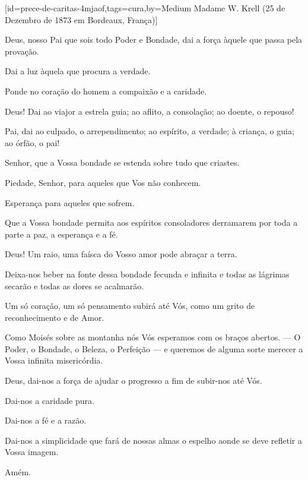 \sclearpage
{}[id={prece-de-caritas-4mjaof},tags={cura},by={Medium Madame W. Krell (25 de Dezembro de 1873 em Bordeaux, França)}]
  \begin{passage}[PT]{}
    Deus, nosso Pai que sois todo Poder e Bondade, dai
    a força àquele que passa pela provação.
    \par
    Dai a luz àquela que procura a verdade.
    \par
    Ponde no coração do homem a compaixão e a caridade.
    \par
    Deus! Dai ao viajor a estrela guia; ao aflito,
    a consolação; ao doente, o repouso!
    \par
    Pai, dai ao culpado, o arrependimento; ao espírito,
    a verdade; à criança, o guia; ao órfão, o pai!
    \par
    Senhor, que a Vossa bondade se estenda sobre tudo
    que criastes.
    \par
    Piedade, Senhor, para aqueles que Vos não conhecem.
    \par
    Esperança para aqueles que sofrem.
    \par
    Que a Vossa bondade permita aos espíritos
    consoladores derramarem por toda a parte a paz, a
    esperança e a fé.
    \par
    Deus! Um raio, uma faísca do Vosso amor pode abraçar
    a terra.
    \par
    Deixa-nos beber na fonte dessa bondade fecunda
    e infinita e todas as lágrimas secarão e todas as
    dores se acalmarão.
    \par
    Um só coração, um só pensamento subirá até Vós,
    como um grito de reconhecimento e de Amor.
    \par
    Como Moisés sobre as montanha nós Vós esperamos
    com os braços abertos. ---
    O Poder, o Bondade, o Beleza, o Perfeição ---
    e queremos de alguma sorte merecer a Vossa infinita
    misericórdia.
    \par
    Deus, dai-nos a força de ajudar o progresso a fim
    de subir-nos até Vós.
    \par
    Dai-nos a caridade pura.
    \par
    Dai-nos a fé e a razão.
    \par
    Dai-nos a simplicidade que fará de nossas almas o
    espelho aonde se deve refletir a Vossa imagem.
    \par
    Amém.
  \end{passage}
